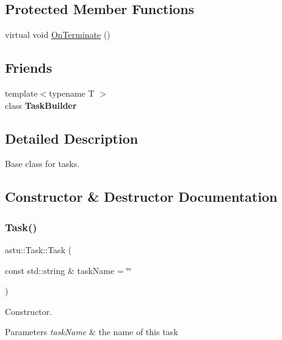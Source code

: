 \subsection*{Protected Member Functions}
\begin{DoxyCompactItemize}
\item 
virtual void \hyperlink{classastu_1_1Task_a7f0a9e45de3d302d52ef0ed13278ec94}{On\+Terminate} ()
\end{DoxyCompactItemize}
\subsection*{Friends}
\begin{DoxyCompactItemize}
\item 
\mbox{\label{classastu_1_1Task_a8bb4b8e223f9d0ede0bba9d70cc24089}} 
{\footnotesize template$<$typename T $>$ }\\class {\bfseries Task\+Builder}
\end{DoxyCompactItemize}


\subsection{Detailed Description}
Base class for tasks. 

\subsection{Constructor \& Destructor Documentation}
\mbox{\label{classastu_1_1Task_a32d5264221777690acdab94974aa2e15}} 
\subsubsection{\texorpdfstring{Task()}{Task()}}
{\footnotesize\ttfamily astu\+::\+Task\+::\+Task (\begin{DoxyParamCaption}\item[{const std\+::string \&}]{task\+Name = {\ttfamily \char`\"{}\char`\"{}} }\end{DoxyParamCaption})\hspace{0.3cm}{\ttfamily [inline]}}

Constructor.


\begin{DoxyParams}{Parameters}
{\em task\+Name} & the name of this task \\
\hline
\end{DoxyParams}
\mbox{\label{classastu_1_1Task_a69df74d5a4c65f313555134404b24f25}} 
